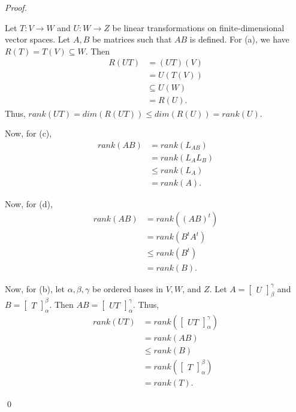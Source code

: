 \documentclass[12pt]{article}
\newenvironment{sol}
    {\emph{Proof.}
    }
    {
    \qed
    }
\begin{document}
\begin{sol}
 Let $T : V \to W$ and $U : W \to Z$ be linear transformations on finite-dimensional vector spaces. Let $A, B$ be matrices such that $AB$ is defined. For (a), we have $R(T) = T(V) \subseteq W$. Then \begin{align*}
     R(UT) &= (UT)(V) \\
     &= U(T(V)) \\
     &\subseteq U(W) \\
     &= R(U).
 \end{align*} Thus, $rank(UT) = dim(R(UT)) \leq dim(R(U)) = rank(U)$.
 
 Now, for (c), \begin{align*}
     rank(AB) &= rank(L_{AB}) \\
     &= rank(L_AL_B) \\
     &\leq rank(L_A) \tag*{(By (a))} \\ 
     &=rank(A).
 \end{align*}
 
 Now, for (d), \begin{align*}
     rank(AB) &= rank((AB)^t) \\
     &= rank(B^tA^t) \\
     &\leq rank(B^t) \tag*{(By (c))} \\ 
     &= rank(B).
 \end{align*}
 
 Now, for (b), let $\alpha, \beta, \gamma$ be ordered bases in $V, W$, and $Z$. Let $A = \begin{bmatrix}
 U
 \end{bmatrix}_\beta^\gamma$ and $B = \begin{bmatrix}
 T
 \end{bmatrix}_\alpha^\beta$. Then $AB = \begin{bmatrix}
 UT
 \end{bmatrix}_\alpha^\gamma$. Thus, \begin{align*}
     rank(UT) &= rank\left( \begin{bmatrix}
     UT
     \end{bmatrix}_\alpha^\gamma \right) \\
     &= rank(AB) \\
     &\leq rank(B) \tag*{(By (b))} \\
     &= rank\left( \begin{bmatrix}
     T
     \end{bmatrix}_\alpha^\beta \right) \\
     &= rank(T).
 \end{align*}
\end{sol}
\end{document}
